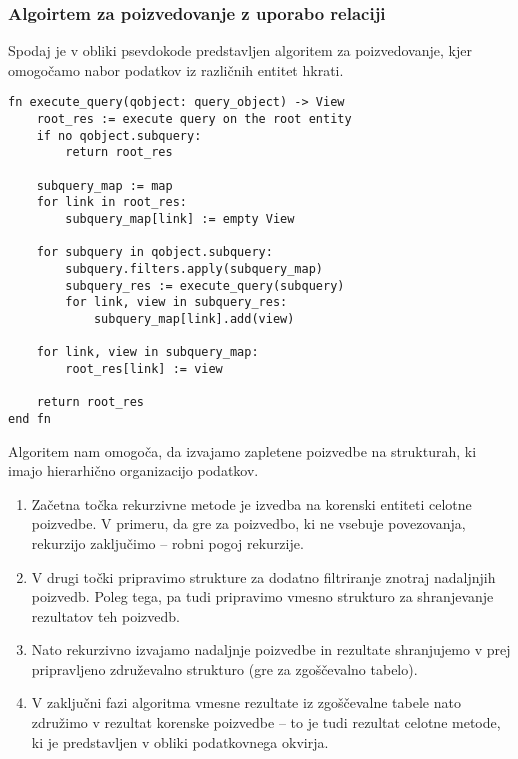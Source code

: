 \documentclass[a4paper,12pt,openright]{book}
\begin{document}
\begin{itemize}
        \subsubsection{Algoirtem za poizvedovanje z uporabo relaciji}

        Spodaj je v obliki psevdokode predstavljen algoritem za poizvedovanje, kjer omogočamo nabor podatkov iz različnih entitet hkrati.

\begin{verbatim}
fn execute_query(qobject: query_object) -> View
    root_res := execute query on the root entity
    if no qobject.subquery:
        return root_res

    subquery_map := map
    for link in root_res:
        subquery_map[link] := empty View

    for subquery in qobject.subquery:
        subquery.filters.apply(subquery_map)
        subquery_res := execute_query(subquery)
        for link, view in subquery_res:
            subquery_map[link].add(view)

    for link, view in subquery_map:
        root_res[link] := view

    return root_res
end fn
\end{verbatim}

        \noindent
        Algoritem nam omogoča, da izvajamo zapletene poizvedbe na strukturah, ki imajo hierarhično organizacijo podatkov. 

        \begin{enumerate}
            \item Začetna točka rekurzivne metode je izvedba na korenski entiteti celotne poizvedbe. V primeru, da gre za poizvedbo, ki ne vsebuje povezovanja, rekurzijo zaključimo – robni pogoj rekurzije.
            \item V drugi točki pripravimo strukture za dodatno filtriranje znotraj nadaljnjih poizvedb. Poleg tega, pa tudi pripravimo vmesno strukturo za shranjevanje rezultatov teh poizvedb.
            \item Nato rekurzivno izvajamo nadaljnje poizvedbe in rezultate shranjujemo v prej pripravljeno združevalno strukturo (gre za zgoščevalno tabelo).
            \item V zaključni fazi algoritma vmesne rezultate iz zgoščevalne tabele nato združimo v rezultat korenske poizvedbe – to je tudi rezultat celotne metode, ki je predstavljen v obliki podatkovnega okvirja.
        \end{enumerate}


\end{itemize}
\end{document}
